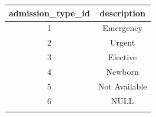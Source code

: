 \documentclass[]{article}
\begin{document}
\begin{itemize}
  \begin{longtable}[c]{@{}cc@{}}
  \toprule
  \begin{minipage}[b]{0.26\columnwidth}\centering\strut
  admission\_type\_id
  \strut\end{minipage} &
  \begin{minipage}[b]{0.17\columnwidth}\centering\strut
  description
  \strut\end{minipage}\tabularnewline
  \midrule
  \endhead
  \begin{minipage}[t]{0.26\columnwidth}\centering\strut
  1
  \strut\end{minipage} &
  \begin{minipage}[t]{0.17\columnwidth}\centering\strut
  Emergency
  \strut\end{minipage}\tabularnewline
  \begin{minipage}[t]{0.26\columnwidth}\centering\strut
  2
  \strut\end{minipage} &
  \begin{minipage}[t]{0.17\columnwidth}\centering\strut
  Urgent
  \strut\end{minipage}\tabularnewline
  \begin{minipage}[t]{0.26\columnwidth}\centering\strut
  3
  \strut\end{minipage} &
  \begin{minipage}[t]{0.17\columnwidth}\centering\strut
  Elective
  \strut\end{minipage}\tabularnewline
  \begin{minipage}[t]{0.26\columnwidth}\centering\strut
  4
  \strut\end{minipage} &
  \begin{minipage}[t]{0.17\columnwidth}\centering\strut
  Newborn
  \strut\end{minipage}\tabularnewline
  \begin{minipage}[t]{0.26\columnwidth}\centering\strut
  5
  \strut\end{minipage} &
  \begin{minipage}[t]{0.17\columnwidth}\centering\strut
  Not Available
  \strut\end{minipage}\tabularnewline
  \begin{minipage}[t]{0.26\columnwidth}\centering\strut
  6
  \strut\end{minipage} &
  \begin{minipage}[t]{0.17\columnwidth}\centering\strut
  NULL
  \strut\end{minipage}\tabularnewline
  \begin{minipage}[t]{0.26\columnwidth}\centering\strut

\end{minipage}
\end{longtable}
\end{itemize}
\end{document}
